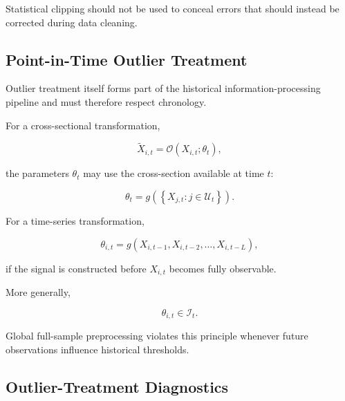 \documentclass[11pt,a4paper]{article}
\begin{document}
Statistical clipping should not be used to conceal errors that should instead
be corrected during data cleaning.


\subsection{Point-in-Time Outlier Treatment}
\label{subsec:pit_outlier_treatment}

Outlier treatment itself forms part of the historical information-processing
pipeline and must therefore respect chronology.

For a cross-sectional transformation,

\begin{equation}
\widetilde{X}_{i,t}
=
\mathcal{O}
\left(
X_{i,t};
\theta_t
\right),
\end{equation}

the parameters $\theta_t$ may use the cross-section available at time $t$:

\begin{equation}
\theta_t
=
g
\left(
\left\{
X_{j,t}
:
j\in\mathcal{U}_t
\right\}
\right).
\end{equation}

For a time-series transformation,

\begin{equation}
\theta_{i,t}
=
g
\left(
X_{i,t-1},
X_{i,t-2},
\ldots,
X_{i,t-L}
\right),
\end{equation}

if the signal is constructed before $X_{i,t}$ becomes fully observable.

More generally,

\begin{equation}
\boxed{
\theta_{i,t}
\in
\mathcal{I}_t.
}
\end{equation}

Global full-sample preprocessing violates this principle whenever future
observations influence historical thresholds.


\subsection{Outlier-Treatment Diagnostics}
\label{subsec:outlier_diagnostics}
\end{document}
